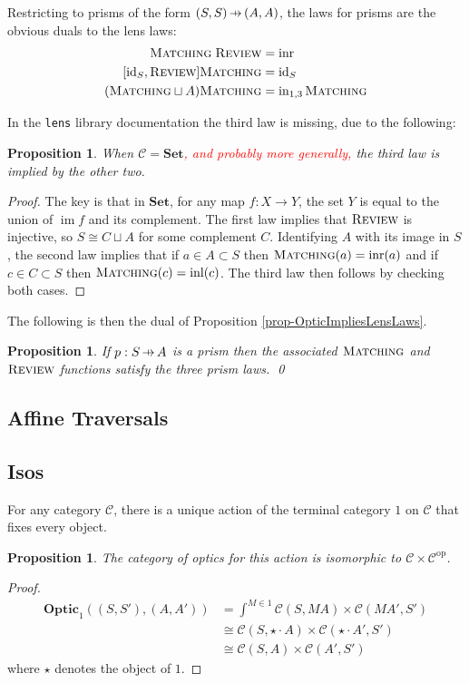 \documentclass[11pt,a4paper]{article}
\theoremstyle{plain}
\newtheorem{proposition}[theorem]{Proposition}
\theoremstyle{definition}
\newcommand{\C}{\mathscr{C}}
\newcommand{\Set}{\mathbf{Set}}
\newcommand{\Optic}{\mathbf{Optic}}
\newcommand{\id}{\mathrm{id}}
\newcommand{\op}{\mathrm{op}}
\newcommand{\inl}{\mathrm{inl}}
\newcommand{\inr}{\mathrm{inr}}
\DeclareMathOperator{\im}{im}
\newcommand{\freview}{\textsc{Review}}
\newcommand{\fmatching}{\textsc{Matching}}
\newcommand{\hto}{\ensuremath{\,\mathaccent\shortmid\rightarrow\,}}
\newcommand{\todo}[1]{\textcolor{red}{\small #1}}
\begin{document}
Restricting to prisms of the form $(S, S) \hto (A, A)$, the laws for prisms are the obvious duals to the lens laws: 
\begin{align*}
\fmatching \; \freview &= \inr \\
[\id_S, \freview] \fmatching &= \id_S \\
(\fmatching \sqcup A) \fmatching &= \mathrm{in}_{1,3} \, \fmatching
\end{align*}

In the \texttt{lens} library documentation the third law is missing, due to the following:

\begin{proposition}
When $\C = \Set$\todo{, and probably more generally,} the third law is implied by the other two.
\end{proposition}
\begin{proof}
The key is that in $\Set$, for any map $f : X \to Y$, the set $Y$ is equal to the union of $\im f$ and its complement. The first law implies that $\freview$ is injective, so $S \cong C \sqcup A$ for some complement $C$. Identifying $A$ with its image in $S$, the second law implies that if $a\in A \subset S$ then $\fmatching(a) = \inr(a)$ and if $c\in C \subset S$ then $\fmatching(c) = \inl(c)$. The third law then follows by checking both cases.
\end{proof}

The following is then the dual of Proposition \ref{prop-OpticImpliesLensLaws}.
\begin{proposition}
\label{prop-OpticImpliesPrismLaws}
If $p : S \hto A$ is a prism then the associated $\fmatching$ and $\freview$ functions satisfy the three prism laws. \qed
\end{proposition}

\subsection{Affine Traversals}


\subsection{Isos}

For any category $\C$, there is a unique action of the terminal category $1$ on $\C$ that fixes every object. 

\begin{proposition}
The category of optics for this action is isomorphic to $\C \times \C^\op$.
\end{proposition}
\begin{proof}
\begin{align*}
\Optic_1((S, S'), (A, A')) &= \int^{M \in 1} \C(S, MA) \times \C(MA', S') \\
&\cong \C(S, \star \cdot A) \times \C(\star \cdot A', S') \\
&\cong \C(S, A) \times \C(A', S')
\end{align*}
where $\star$ denotes the object of $1$.
\end{proof}
\end{document}
